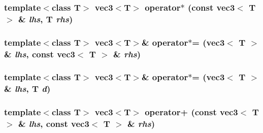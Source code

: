 \hypertarget{classnv_1_1vec3_1a68fca99ee9a6ba467baf36d9b477dd}{
\subsubsection[{operator$\ast$}]{\setlength{\rightskip}{0pt plus 5cm}template$<$class T$>$ {\bf vec3}$<$T$>$ operator$\ast$ (const {\bf vec3}$<$ T $>$ \& {\em lhs}, \/  T {\em rhs})}}
\label{classnv_1_1vec3_1a68fca99ee9a6ba467baf36d9b477dd}


\hypertarget{classnv_1_1vec3_d31ba8e621bcfefb698bcd943f2c3a68}{
\subsubsection[{operator$\ast$=}]{\setlength{\rightskip}{0pt plus 5cm}template$<$class T$>$ {\bf vec3}$<$T$>$\& operator$\ast$= ({\bf vec3}$<$ T $>$ \& {\em lhs}, \/  const {\bf vec3}$<$ T $>$ \& {\em rhs})}}
\label{classnv_1_1vec3_d31ba8e621bcfefb698bcd943f2c3a68}


\hypertarget{classnv_1_1vec3_573e32ced446f83232eba6e5ea05861b}{
\subsubsection[{operator$\ast$=}]{\setlength{\rightskip}{0pt plus 5cm}template$<$class T$>$ {\bf vec3}$<$T$>$\& operator$\ast$= ({\bf vec3}$<$ T $>$ \& {\em lhs}, \/  T {\em d})}}
\label{classnv_1_1vec3_573e32ced446f83232eba6e5ea05861b}


\hypertarget{classnv_1_1vec3_8f8d95ac2a92eb4a9592592f08d25941}{
\subsubsection[{operator+}]{\setlength{\rightskip}{0pt plus 5cm}template$<$class T$>$ {\bf vec3}$<$T$>$ operator+ (const {\bf vec3}$<$ T $>$ \& {\em lhs}, \/  const {\bf vec3}$<$ T $>$ \& {\em rhs})}}
\label{classnv_1_1vec3_8f8d95ac2a92eb4a9592592f08d25941}


